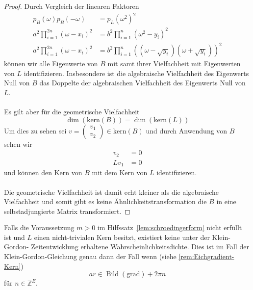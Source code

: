 \documentclass[11pt,a4paper,leqno]{report}
\numberwithin{equation}{chapter}
\begin{document}
\begin{proof}
Durch Vergleich der linearen Faktoren
\begin{align*}
	p_{B}(\omega)p_{B}(-\omega)&=p_{L}(\omega^2)^2\\
	a^2\prod_{i=1}^{2n}(\omega-x_i)^2 &= b^2\prod_{i=1}^n(\omega^2-y_i)^2\\
	a^2\prod_{i=1}^{2n}(\omega-x_i)^2 &= b^2\prod_{i=1}^n((\omega-\sqrt{y_i})(\omega+\sqrt{y_i}))^2
\end{align*}
k\"onnen wir alle Eigenwerte von $B$ mit samt ihrer Vielfachheit mit Eigenwerten von $L$ identifizieren. Insbesondere ist die algebraische Vielfachheit des Eigenwerts Null von $B$ das Doppelte der algebraischen Vielfachheit des Eigenwerts Null von $L$.\\
\\
Es gilt aber f\"ur die geometrische Vielfachheit
\begin{equation*}
	\dim(\text{kern}(B))=\dim(\text{kern}(L))
\end{equation*}
Um dies zu sehen sei $v=\begin{pmatrix}
	v_1  \\ v_2
\end{pmatrix}\in\text{kern}(B)$ und durch Anwendung von $B$ sehen wir
\begin{align*}
	v_2 &= 0\\
	Lv_1&= 0
\end{align*}
und k\"onnen den Kern von $B$ mit dem Kern von $L$ identifizieren.\\
\\
Die geometrische Vielfachheit ist damit echt kleiner als die algebraische Vielfachheit und somit gibt es keine \"Ahnlichkeitstransformation die $B$ in eine selbstadjungierte Matrix transformiert.
\end{proof}
\noindent
Falls die Voraussetzung $m>0$ im Hilfssatz~\ref{lem:schroedingerform} nicht erfüllt ist und $L$ 
einen nicht-trivialen Kern besitzt, existiert keine unter der Klein-Gordon- Zeitentwicklung 
erhaltene Wahrscheinlichkeitsdichte. Dies ist im Fall der Klein-Gordon-Gleichung genau dann der Fall wenn (siehe \ref{rem:Eichgradient-Kern})
\begin{equation}
	ar \in \operatorname{Bild}(\mathrm{grad}) + 2\pi n
\end{equation}
für $n\in\mathbb{Z}^E$.

\newpage
\end{document}

